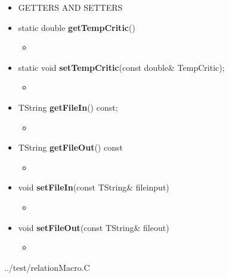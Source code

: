 \begin{itemize}
\begin{itemize}
\newpage

		\item[]	GETTERS AND SETTERS \\

			\item[] static double \textbf{getTempCritic}()
			\begin{itemize}
				\item[]
			\end{itemize}

			\item[] static void \textbf{setTempCritic}(const double\& \textunderscore TempCritic);
			\begin{itemize}
				\item[]
			\end{itemize}

			\item[] TString \textbf{getFileIn}() const;
			\begin{itemize}
				\item[]
			\end{itemize}

			\item[] TString \textbf{getFileOut}() const
			\begin{itemize}
				\item[]
			\end{itemize}

			\item[]  void \textbf{setFileIn}(const TString\& file\textunderscore input)
			\begin{itemize}
				\item[]
			\end{itemize}

			\item[] void \textbf{setFileOut}(const TString\& file\textunderscore out)
			\begin{itemize}
				\item[]
			\end{itemize}

	\end{itemize}


      \end{itemize}

      
      {../test/relationMacro.C}
